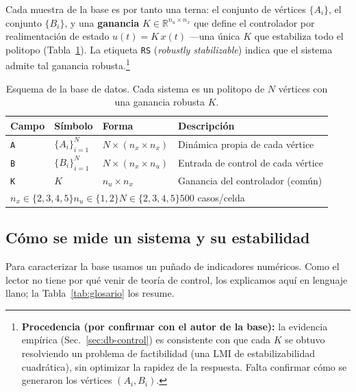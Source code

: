 Cada muestra de la base es por tanto una terna: el conjunto de vértices
$\{A_i\}$, el conjunto $\{B_i\}$, y una \textbf{ganancia} $K\in\mathbb{R}^{n_u\times
n_x}$ que define el controlador por realimentación de estado $u(t)=K\,x(t)$ —una
única $K$ que estabiliza todo el politopo (Tabla~\ref{tab:esquema}). La etiqueta
\texttt{RS} (\emph{robustly stabilizable}) indica que el sistema admite tal
ganancia robusta.\footnote{\textbf{Procedencia (por confirmar con el autor de la
base):} la evidencia empírica (Sec.~\ref{sec:db-control}) es consistente con que
cada $K$ se obtuvo resolviendo un problema de factibilidad (una LMI de
estabilizabilidad cuadrática), sin optimizar la rapidez de la respuesta. Falta
confirmar cómo se generaron los vértices $(A_i,B_i)$.}

\begin{table}[t]
  \centering
  \caption{Esquema de la base de datos. Cada sistema es un politopo de $N$
  vértices con una ganancia robusta $K$.}
  \label{tab:esquema}
  \begin{tabular}{llll}
    \toprule
    Campo & Símbolo & Forma & Descripción \\
    \midrule
    \texttt{A} & $\{A_i\}_{i=1}^N$ & $N\times(n_x\!\times\! n_x)$ & Dinámica propia de cada vértice \\
    \texttt{B} & $\{B_i\}_{i=1}^N$ & $N\times(n_x\!\times\! n_u)$ & Entrada de control de cada vértice \\
    \texttt{K} & $K$               & $n_u\times n_x$             & Ganancia del controlador (común) \\
    \midrule
    \multicolumn{4}{l}{$n_x\in\{2,3,4,5\}$\quad $n_u\in\{1,2\}$\quad $N\in\{2,3,4,5\}$\quad $500$ casos/celda} \\
    \bottomrule
  \end{tabular}
\end{table}

\subsection{Cómo se mide un sistema y su estabilidad}
\label{sec:db-conceptos}

Para caracterizar la base usamos un puñado de indicadores numéricos. Como el
lector no tiene por qué venir de teoría de control, los explicamos aquí en
lenguaje llano; la Tabla~\ref{tab:glosario} los resume.

